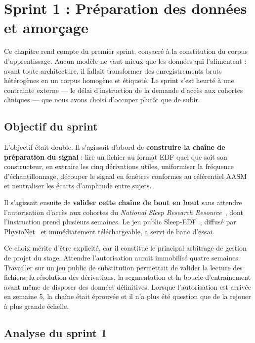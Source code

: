 \chapter{Sprint 1 : Préparation des données et amorçage}
\label{chap:sprint1}


Ce chapitre rend compte du premier sprint, consacré à la constitution du corpus
d'apprentissage. Aucun modèle ne vaut mieux que les données qui l'alimentent : avant
toute architecture, il fallait transformer des enregistrements bruts hétérogènes en un
corpus homogène et étiqueté. Le sprint s'est heurté à une contrainte externe --- le
délai d'instruction de la demande d'accès aux cohortes cliniques --- que nous avons
choisi d'occuper plutôt que de subir.

\section{Objectif du sprint}

L'objectif était double. Il s'agissait d'abord de \textbf{construire la chaîne de
préparation du signal} : lire un fichier au format EDF quel que soit son constructeur,
en extraire les cinq dérivations utiles, uniformiser la fréquence d'échantillonnage,
découper le signal en fenêtres conformes au référentiel AASM et neutraliser les écarts
d'amplitude entre sujets.

Il s'agissait ensuite de \textbf{valider cette chaîne de bout en bout} sans attendre
l'autorisation d'accès aux cohortes du \emph{National Sleep Research
Resource}~\cite{zhang2018nsrr}, dont l'instruction prend plusieurs semaines. Le jeu
public Sleep-EDF~\cite{kemp2000}, diffusé par PhysioNet~\cite{goldberger2000} et
immédiatement téléchargeable, a servi de banc d'essai.

Ce choix mérite d'être explicité, car il constitue le principal arbitrage de gestion de
projet du stage. Attendre l'autorisation aurait immobilisé quatre semaines. Travailler
sur un jeu public de substitution permettait de valider la lecture des fichiers, la
résolution des dérivations, la segmentation et la boucle d'entraînement avant même de
disposer des données définitives. Lorsque l'autorisation est arrivée en semaine 5, la
chaîne était éprouvée et il n'a plus été question que de la rejouer à plus grande
échelle.

\section{Analyse du sprint 1}

